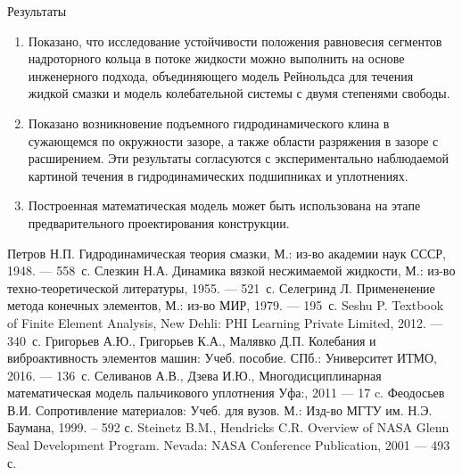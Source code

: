 \documentclass[ignoreonframetext,unicode]{beamer}
\begin{document}
\begin{frame}{Результаты}
	\begin{block}{}
	\begin{enumerate}	
		\item Показано, что исследование устойчивости положения равновесия сегментов надроторного кольца в потоке жидкости можно выполнить на основе инженерного подхода, объединяющего модель Рейнольдса для течения жидкой смазки и модель колебательной системы с двумя степенями свободы.
		\item Показано возникновение подъемного гидродинамического клина в сужающемся по окружности зазоре, а также области разряжения в зазоре с расширением. Эти результаты согласуются с экспериментально наблюдаемой картиной течения в гидродинамических подшипниках и уплотнениях.
		\item Построенная математическая модель может быть использована на этапе предварительного проектирования конструкции.
	\end{enumerate}
	\end{block}	

\end{frame}	

\begin{frame}{}
	\begin{thebibliography}{00}
		 Петров Н.П. Гидродинамическая теория смазки, М.: из-во академии наук СССР, 1948. --- 558~с.
		 Слезкин Н.А. Динамика вязкой несжимаемой жидкости, М.: из-во техно-теоретической литературы, 1955. --- 521~с.
		 Селегринд Л. Примененение метода конечных элементов, М.: из-во МИР, 1979. --- 195~с.
		 Seshu P. Textbook of
		Finite Element
		Analysis, New Dehli: PHI Learning Private Limited, 2012. --- 340~с.
		 Григорьев А.Ю., Григорьев К.А., Малявко Д.П. Колебания
		и виброактивность элементов машин: Учеб. пособие. СПб.: Университет ИТМО, 2016. --- 136~с.
		  Селиванов А.В., Дзева И.Ю., Многодисциплинарная математическая модель пальчикового уплотнения Уфа:, 2011 --- 17 c.
		 Феодосьев В.И. Сопротивление материалов: Учеб. для вузов. М.: Изд-во МГТУ им.
		Н.Э. Баумана, 1999. – 592 с.
		 Steinetz B.M., Hendricks C.R. Overview of NASA Glenn Seal Development
		Program. Nevada: NASA
		Conference Publication, 2001 --- 493 с.
		
	\end{thebibliography}
\end{frame}
\end{document}
